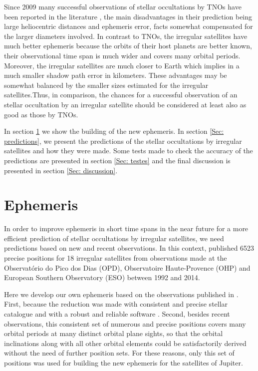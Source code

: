 \documentclass[useAMS,usenatbib]{mn2e}
\begin{document}
Since 2009 many successful observations of stellar occultations by TNOs have been reported in the literature \citep{Elliot2010, Sicardy2011, Ortiz2012, Braga-Ribas2013}, the main disadvantages in their prediction being large heliocentric distances and ephemeris error, facts somewhat compensated for the larger diameters involved. In contrast to TNOs, the irregular satellites have much better ephemeris because the orbits of their host planets are better  known, their observational time span is much wider and covers many orbital periods. Moreover, the irregular satellites are much closer to Earth which implies in a much smaller shadow path error in kilometers. These advantages may be somewhat balanced by the smaller sizes estimated for the irregular satellites.Thus, in comparison, the chances for a successful observation of an stellar occultation by an irregular satellite should be considered at least also as good as those by TNOs.

In section \ref{Sec: integration} we show the building of the new ephemeris. In section \ref{Sec: predictions}, we present the predictions of the stellar occultations by irregular satellites and how they were made. Some tests made to check the accuracy of the predictions are presented in section \ref{Sec: testes} and the final discussion is presented in section \ref{Sec: discussion}.

\section{Ephemeris} \label{Sec: integration}

In order to improve ephemeris in short time spans in the near future for a more efficient prediction of stellar occultations by irregular satellites, we need predictions based on new and recent observations. In this context, \cite{GomesJunior2015} published 6523 precise positions for 18 irregular satellites from observations made at the Observatório do Pico dos Dias (OPD), Observatoire Haute-Provence (OHP) and European Southern Observatory (ESO) between 1992 and 2014. 

Here we develop our own ephemeris based on the observations published in \cite{GomesJunior2015}. First, because the reduction was made with consistent and precise stellar catalogue and with a robust and reliable software \citep[PRAIA,][]{Assafin2011}. Second, besides recent observations, this consistent set of numerous and precise positions covers many orbital periods at many distinct orbital plane sights, so that the orbital inclinations along with all other orbital elements could be satisfactorily derived without the need of further position sets. For these reasons, only this set of positions was used for building the new ephemeris for the satellites of Jupiter.
\end{document}
